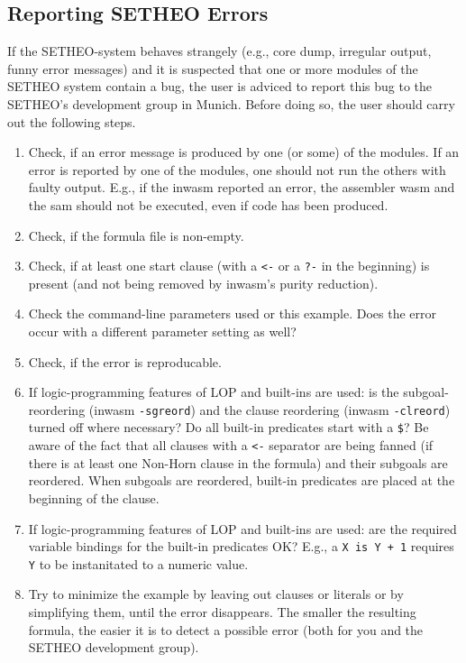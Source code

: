 %

\subsection{Reporting SETHEO Errors}
\label{subsec:reporting-errors}

If the SETHEO-system behaves strangely (e.g., core dump, irregular
output, funny error messages) and it is suspected that one or more
modules of the SETHEO system contain a bug, the user is
adviced to report this bug to the SETHEO's development group
in Munich.
Before doing so, the user should carry out the following steps.

\begin{enumerate}
\item
Check,
if an error message is produced by one (or some) of the modules.
If an error is reported by one of the modules, one should not run the
others with faulty output. E.g., if the inwasm reported an error,
the assembler wasm and the sam should not be executed, even if code has
been produced.
\item
Check,
if the formula file is non-empty.
\item
Check,
if at least one start clause (with a {\tt <-} or a {\tt ?-}
in the beginning)
is present (and not being removed by inwasm's purity reduction).
\item
Check the command-line parameters used or this example.
Does the error occur with a different parameter setting as well?
\item
Check, if the error is reproducable.
\item
If logic-programming features of LOP and built-ins are used:
is the subgoal-reordering (inwasm {\tt -sgreord})
and the clause reordering (inwasm {\tt -clreord})
turned off where necessary?
Do all built-in predicates start with a {\tt\$}?
Be aware of the fact that all clauses with a {\tt <-} separator
are being fanned (if there is at least one Non-Horn clause in the formula)
and their subgoals are reordered.
When subgoals are reordered, built-in predicates are placed
at the beginning of the clause.
\item
If logic-programming features of LOP and built-ins are used:
are the required variable bindings for the built-in predicates OK?
E.g., a {\tt X is Y + 1} requires {\tt Y} to be instanitated to
a numeric value.
\item
Try to minimize the example by leaving out clauses or literals or
by simplifying them, until the error disappears.
The smaller the resulting formula, the easier it is to detect a possible
error (both for you and the SETHEO development group).
\end{enumerate}

